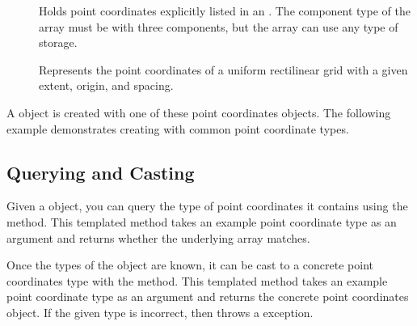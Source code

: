 \begin{description}
\item[] Holds point coordinates explicitly
  listed in an . The component type of the
  array must be  with three components, but the array can use any
  type of storage.
\item[] Represents the point coordinates
  of a uniform rectilinear grid with a given extent, origin, and spacing.
\end{description}

A  object is created with one of
these point coordinates objects. The following example demonstrates
creating  with common point
coordinate types.


\subsection{Querying and Casting}
\label{sec:DynamicPointCoordinatesQueryingAndCasting}

Given a  object, you can query the
type of point coordinates it contains using the
 method. This templated method takes an
example point coordinate type as an argument and returns whether the
underlying array matches.


Once the types of the  object are
known, it can be cast to a concrete point coordinates type with the
 method. This templated method takes an
example point coordinate type as an argument and returns the concrete point
coordinates object. If the given type is incorrect, then
 throws a 
exception.


